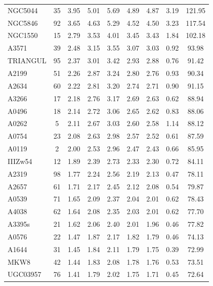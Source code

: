 \documentclass[10pt,aps,pra,reprint,amsmath,amsfonts,amssymb,showpacs,nofootinbib,floatfix]{revtex4-1}
\begin{document}
\begin{table}
\begin{minipage}{2.0\columnwidth}
\begin{tabular}{l  c c c c c c c c}
NGC5044  &  35 &   3.95 &   5.01 &   5.69 &   4.89 &   4.87 &   3.19 & 121.95 \\
NGC5846  &  92 &   3.65 &   4.63 &   5.29 &   4.52 &   4.50 &   3.23 & 117.54 \\
NGC1550  &  15 &   2.79 &   3.53 &   4.01 &   3.45 &   3.43 &   1.84 & 102.18 \\
A3571    &  39 &   2.48 &   3.15 &   3.55 &   3.07 &   3.03 &   0.92 &  93.98 \\
TRIANGUL &  95 &   2.37 &   3.01 &   3.42 &   2.93 &   2.88 &   0.76 &  91.42 \\
A2199    &  51 &   2.26 &   2.87 &   3.24 &   2.80 &   2.76 &   0.93 &  90.34 \\
A2634    &  60 &   2.22 &   2.81 &   3.20 &   2.74 &   2.71 &   0.90 &  91.15 \\
A3266    &  17 &   2.18 &   2.76 &   3.17 &   2.69 &   2.63 &   0.62 &  88.94 \\
A0496    &  18 &   2.14 &   2.72 &   3.06 &   2.65 &   2.62 &   0.83 &  88.06 \\
A0262    &   5 &   2.11 &   2.67 &   3.03 &   2.60 &   2.58 &   1.14 &  88.12 \\
A0754    &  23 &   2.08 &   2.63 &   2.98 &   2.57 &   2.52 &   0.61 &  87.59 \\
A0119    &   2 &   2.00 &   2.53 &   2.96 &   2.47 &   2.43 &   0.66 &  85.95 \\
IIIZw54  &  12 &   1.89 &   2.39 &   2.73 &   2.33 &   2.30 &   0.72 &  84.11 \\
A2319    &  98 &   1.77 &   2.24 &   2.56 &   2.19 &   2.13 &   0.47 &  78.11 \\
A2657    &  61 &   1.71 &   2.17 &   2.45 &   2.12 &   2.08 &   0.54 &  79.87 \\
A0539    &  71 &   1.65 &   2.09 &   2.37 &   2.04 &   2.01 &   0.62 &  78.43 \\
A4038    &  62 &   1.64 &   2.08 &   2.35 &   2.03 &   2.01 &   0.62 &  77.70 \\
A3395s   &  21 &   1.62 &   2.06 &   2.40 &   2.01 &   1.96 &   0.46 &  77.82 \\
A0576    &  22 &   1.47 &   1.87 &   2.17 &   1.82 &   1.79 &   0.46 &  74.13 \\
A1644    &  31 &   1.45 &   1.84 &   2.11 &   1.79 &   1.75 &   0.39 &  72.99 \\
MKW8     &  42 &   1.44 &   1.83 &   2.08 &   1.78 &   1.76 &   0.53 &  73.51 \\
UGC03957 &  76 &   1.41 &   1.79 &   2.02 &   1.75 &   1.71 &   0.45 &  72.64 \\

\end{tabular}
\end{minipage}
\end{table}
\end{document}
